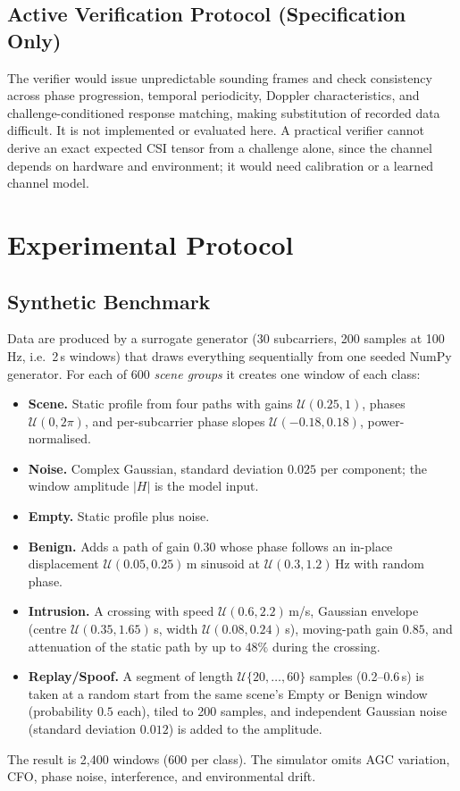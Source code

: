 \documentclass[conference]{IEEEtran}
\begin{document}
\subsection{Active Verification Protocol (Specification Only)}
The verifier would issue unpredictable sounding frames and check consistency across phase progression, temporal periodicity, Doppler characteristics, and challenge-conditioned response matching, making substitution of recorded data difficult. It is not implemented or evaluated here. A practical verifier cannot derive an exact expected CSI tensor from a challenge alone, since the channel depends on hardware and environment; it would need calibration or a learned channel model.

\section{Experimental Protocol}
\subsection{Synthetic Benchmark}
Data are produced by a surrogate generator (30 subcarriers, 200 samples at 100\,Hz, i.e.\ 2\,s windows) that draws everything sequentially from one seeded NumPy generator. For each of 600 \emph{scene groups} it creates one window of each class:
\begin{itemize}
\item \textbf{Scene.} Static profile from four paths with gains $\mathcal{U}(0.25,1)$, phases $\mathcal{U}(0,2\pi)$, and per-subcarrier phase slopes $\mathcal{U}(-0.18,0.18)$, power-normalised.
\item \textbf{Noise.} Complex Gaussian, standard deviation $0.025$ per component; the window amplitude $|H|$ is the model input.
\item \textbf{Empty.} Static profile plus noise.
\item \textbf{Benign.} Adds a path of gain $0.30$ whose phase follows an in-place displacement $\mathcal{U}(0.05,0.25)$\,m sinusoid at $\mathcal{U}(0.3,1.2)$\,Hz with random phase.
\item \textbf{Intrusion.} A crossing with speed $\mathcal{U}(0.6,2.2)$\,m/s, Gaussian envelope (centre $\mathcal{U}(0.35,1.65)$\,s, width $\mathcal{U}(0.08,0.24)$\,s), moving-path gain $0.85$, and attenuation of the static path by up to $48\%$ during the crossing.
\item \textbf{Replay/Spoof.} A segment of length $\mathcal{U}\{20,\dots,60\}$ samples (0.2--0.6\,s) is taken at a random start from the same scene's Empty or Benign window (probability $0.5$ each), tiled to 200 samples, and independent Gaussian noise (standard deviation $0.012$) is added to the amplitude.
\end{itemize}
The result is 2,400 windows (600 per class). The simulator omits AGC variation, CFO, phase noise, interference, and environmental drift.
\end{document}
